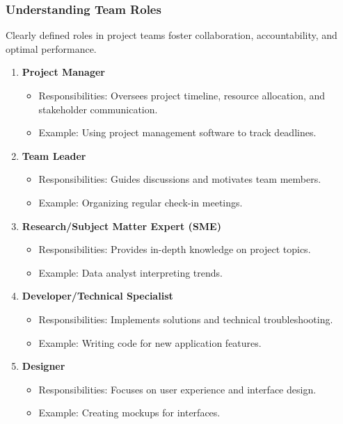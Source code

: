 \documentclass[aspectratio=169]{beamer}
\begin{document}
\begin{frame}[fragile]
    \frametitle{Understanding Team Roles}
    Clearly defined roles in project teams foster collaboration, accountability, and optimal performance.
    \begin{enumerate}
        \item \textbf{Project Manager}
            \begin{itemize}
                \item Responsibilities: Oversees project timeline, resource allocation, and stakeholder communication.
                \item Example: Using project management software to track deadlines.
            \end{itemize}

        \item \textbf{Team Leader}
            \begin{itemize}
                \item Responsibilities: Guides discussions and motivates team members.
                \item Example: Organizing regular check-in meetings.
            \end{itemize}

        \item \textbf{Research/Subject Matter Expert (SME)}
            \begin{itemize}
                \item Responsibilities: Provides in-depth knowledge on project topics.
                \item Example: Data analyst interpreting trends.
            \end{itemize}

        \item \textbf{Developer/Technical Specialist}
            \begin{itemize}
                \item Responsibilities: Implements solutions and technical troubleshooting.
                \item Example: Writing code for new application features.
            \end{itemize}

        \item \textbf{Designer}
            \begin{itemize}
                \item Responsibilities: Focuses on user experience and interface design.
                \item Example: Creating mockups for interfaces.
            \end{itemize}


\end{enumerate}
\end{frame}
\end{document}
